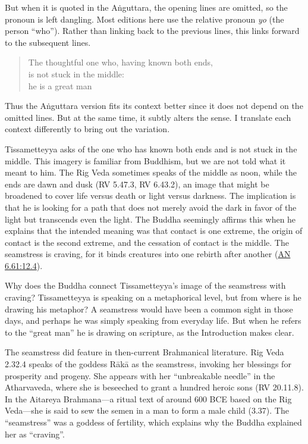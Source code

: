\documentclass[12pt,openany]{book}%
\begin{document}
But when it is quoted in the \textsanskrit{Aṅguttara}, the opening lines are omitted, so the pronoun is left dangling. Most editions here use the relative pronoun \textit{yo} (the person “who”). Rather than linking back to the previous lines, this links forward to the subsequent lines.

\begin{verse}%
The thoughtful one who, having known both ends, \\
is not stuck in the middle: \\
he is a great man

%
\end{verse}

Thus the \textsanskrit{Aṅguttara} version fits its context better since it does not depend on the omitted lines. But at the same time, it subtly alters the sense. I translate each context differently to bring out the variation.

Tissametteyya asks of the one who has known both ends and is not stuck in the middle. This imagery is familiar from Buddhism, but we are not told what it meant to him. The Rig Veda sometimes speaks of the middle as noon, while the ends are dawn and dusk (RV 5.47.3, RV 6.43.2), an image that might be broadened to cover life versus death or light versus darkness. The implication is that he is looking for a path that does not merely avoid the dark in favor of the light but transcends even the light. The Buddha seemingly affirms this when he explains that the intended meaning was that contact is one extreme, the origin of contact is the second extreme, and the cessation of contact is the middle. The seamstress is craving, for it binds creatures into one rebirth after another (\href{https://suttacentral.net/an6.61/en/sujato\#12.4}{AN 6.61:12.4}).

Why does the Buddha connect Tissametteyya’s image of the seamstress with craving? Tissametteyya is speaking on a metaphorical level, but from where is he drawing his metaphor? A seamstress would have been a common sight in those days, and perhaps he was simply speaking from everyday life. But when he refers to the “great man” he is drawing on scripture, as the Introduction makes clear.

The seamstress did feature in then-current Brahmanical literature. Rig Veda 2.32.4 speaks of the goddess \textsanskrit{Rākā} as the seamstress, invoking her blessings for prosperity and progeny. She appears with her “unbreakable needle” in the Atharvaveda, where she is beseeched to grant a hundred heroic sons (RV 20.11.8). In the Aitareya Brahmana—a ritual text of around 600 BCE based on the Rig Veda—she is said to sew the semen in a man to form a male child (3.37). The “seamstress” was a goddess of fertility, which explains why the Buddha explained her as “craving”.
\end{document}
